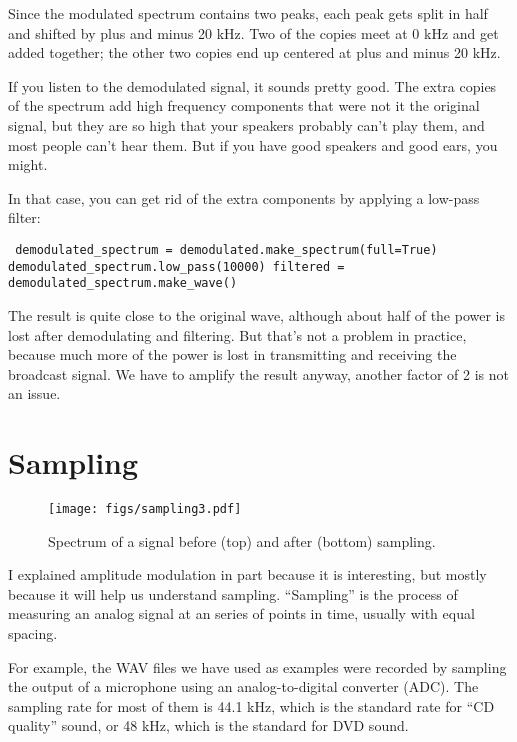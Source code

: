 \documentclass[12pt]{book} \usepackage[width=5.5in,height=8.5in, hmarginratio=3:2,vmarginratio=1:1]{geometry}
\begin{document}
Since the modulated spectrum contains two peaks, each peak gets split in half and shifted by plus and minus 20 kHz. Two of the copies meet at 0 kHz and get added together; the other two copies end up centered at plus and minus 20 kHz. 

If you listen to the demodulated signal, it sounds pretty good. The extra copies of the spectrum add high frequency components that were not it the original signal, but they are so high that your speakers probably can't play them, and most people can't hear them. But if you have good speakers and good ears, you might. 

In that case, you can get rid of the extra components by applying a low-pass filter: 

\begin{verbatim} demodulated_spectrum = demodulated.make_spectrum(full=True) demodulated_spectrum.low_pass(10000) filtered = demodulated_spectrum.make_wave() \end{verbatim} 

The result is quite close to the original wave, although about half of the power is lost after demodulating and filtering. But that's not a problem in practice, because much more of the power is lost in transmitting and receiving the broadcast signal. We have to amplify the result anyway, another factor of 2 is not an issue. 

\section{Sampling} 

\begin{figure} 

\centerline{\texttt{[image: figs/sampling3.pdf]}} \caption{Spectrum of a signal before (top) and after (bottom) sampling.} \label{fig.sampling3} \end{figure} 

I explained amplitude modulation in part because it is interesting, but mostly because it will help us understand sampling. ``Sampling'' is the process of measuring an analog signal at an series of points in time, usually with equal spacing. 

For example, the WAV files we have used as examples were recorded by sampling the output of a microphone using an analog-to-digital converter (ADC). The sampling rate for most of them is 44.1 kHz, which is the standard rate for ``CD quality'' sound, or 48 kHz, which is the standard for DVD sound. 
\end{document}
